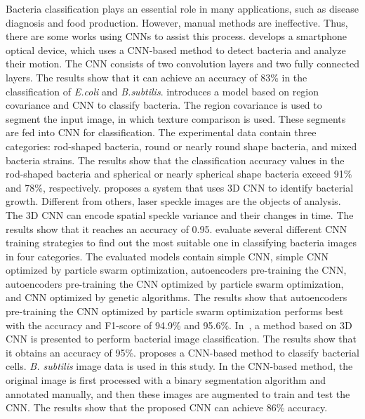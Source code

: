 Bacteria classification plays an essential role in many applications, such as disease diagnosis and food production. However, manual methods are ineffective. Thus, there are some works using CNNs to assist this process. \cite{Balagurusamy-2019-DDBD} develops a smartphone optical device, which uses a CNN-based method to detect bacteria and analyze their motion. The CNN consists of two convolution layers and two fully connected layers. The results show that it can achieve an accuracy of 83\% in the classification of \emph{E.coli} and \emph{B.subtilis}. \cite{Polap-2019-BSCU} introduces a model based on region covariance and CNN to classify bacteria. The region covariance is used to segment the input image, in which texture comparison is used. These segments are fed into CNN for classification. The experimental data contain three categories: rod-shaped bacteria, round or nearly round shape bacteria, and mixed bacteria strains. The results show that the classification accuracy values in the rod-shaped bacteria and spherical or nearly spherical shape bacteria exceed 91\% and 78\%, respectively. \cite{Bliznuks-2020-ENNS} proposes a system that uses 3D CNN to identify bacterial growth. Different from others, laser speckle images are the objects of analysis. The 3D CNN can encode spatial speckle variance and their changes in time. The results show that it reaches an accuracy of 0.95. \cite{Chopra-2020-NMBC} evaluate several different CNN training strategies to find out the most suitable one in classifying bacteria images in four categories. The evaluated models contain simple CNN, simple CNN optimized by particle swarm optimization, autoencoders pre-training the CNN, autoencoders pre-training the CNN optimized by particle swarm optimization, and CNN optimized by genetic algorithms. The results show that autoencoders pre-training the CNN optimized by particle swarm optimization performs best with the accuracy and F1-score of 94.9\% and 95.6\%. In~\cite{Mhathesh-2020-A3CN}, a method based on 3D CNN is presented to perform bacterial image classification. The results show that it obtains an accuracy of 95\%. \cite{Tamiev-2020-ACBC} proposes a CNN-based method to classify bacterial cells. \emph{B. subtilis} image data is used in this study. In the CNN-based method, the original image is first processed with a binary segmentation algorithm and annotated manually, and then these images are augmented to train and test the CNN. The results show that the proposed CNN can achieve 86\% accuracy.

